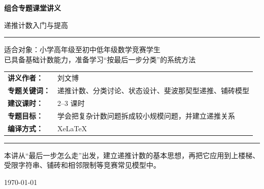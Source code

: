 \documentclass[11pt,a4paper,fontset=fandol]{ctexart}
\theoremstyle{formaltheorem}
\theoremstyle{formalexample}
\begin{document}
\thispagestyle{empty}
\begin{titlepage}
\centering
\vspace*{0.9cm}

\begin{tcolorbox}[
  enhanced,
  width=0.92\textwidth,
  colback=white,
  colframe=mainblue,
  boxrule=1pt,
  arc=0mm,
  left=6mm,
  right=6mm,
  top=8mm,
  bottom=8mm
]
\centering

{\fontsize{24}{30}\selectfont\bfseries 组合专题课堂讲义\par}
\vspace{0.7cm}
{\fontsize{17}{22}\selectfont 递推计数入门与提高\par}

\vspace{1.1cm}
\color{rulegray}\rule{0.72\textwidth}{0.7pt}\par
\vspace{1cm}

\begin{tcolorbox}[colback=lightblue,colframe=mainblue,width=0.82\textwidth,boxrule=1pt]
\centering
{\Large 适合对象：小学高年级至初中低年级数学竞赛学生}\\[0.4em]
{\large 已具备基础计数能力，准备学习“按最后一步分类”的系统方法}
\end{tcolorbox}

\vspace{1.2cm}

\renewcommand{\arraystretch}{1.42}
\begin{tabular}{>{\bfseries}p{3.5cm}p{8cm}}
讲义作者： & 刘文博 \\
专题关键词： & 递推计数、分类讨论、状态设计、斐波那契型递推、铺砖模型 \\
建议课时： & 2--3 课时 \\
专题目标： & 学会把复杂计数问题拆成较小规模问题，并建立递推关系 \\
编译方式： & XeLaTeX \\
\end{tabular}

\vspace{1.2cm}
\color{rulegray}\rule{0.72\textwidth}{0.7pt}\par
\vspace{0.8cm}

{\normalsize 本讲从“最后一步怎么走”出发，建立递推计数的基本思想，再把它应用到上楼梯、受限字符串、铺砖和相邻限制等竞赛常见模型中。\par}

\vspace{0.5cm}
{\large \today\par}
\end{tcolorbox}
\end{titlepage}
\end{document}

